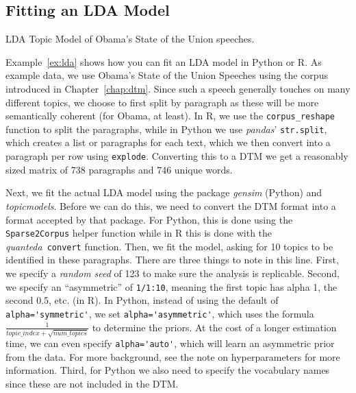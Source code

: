 \subsection{Fitting an LDA Model}\label{sec:ldafit}


\begin{ccsexample}
\caption{LDA Topic Model of Obama's State of the Union speeches.}\label{ex:lda}
\end{ccsexample}

Example~\ref{ex:lda} shows how you can fit an LDA model in Python or R.
As example data, we use Obama's State of the Union Speeches using the corpus introduced in Chapter~\ref{chap:dtm}.
Since such a speech generally touches on many different topics, we choose to first split by paragraph
as these will be more semantically coherent (for Obama, at least).
In R, we use the \texttt{corpus\_reshape} function to split the paragraphs,
while in Python we use \emph{pandas}' \texttt{str.split}, which creates a list or paragraphs for each text,
which we then convert into a paragraph per row using \texttt{explode}.
Converting this to a DTM we get a reasonably sized matrix of 738 paragraphs and 746 unique words.

Next, we fit the actual LDA model using the package \emph{gensim} (Python) and \emph{topicmodels}.
Before we can do this, we need to convert the DTM format into a format accepted by that package.
For Python, this is done using the \texttt{Sparse2Corpus} helper function while in R this is done with the \emph{quanteda}\ \texttt{convert} function.
Then, we fit the model, asking for 10 topics to be identified in these paragraphs.
There are three things to note in this line.
First, we specify a \emph{random seed} of 123 to make sure the analysis is replicable.
Second, we specify an ``asymmetric'' of \verb|1/1:10|, meaning the first topic has alpha 1, the second 0.5, etc. (in R).
In Python, instead  of using the default of \verb|alpha='symmetric'|, we set  \verb|alpha='asymmetric'|, which uses the formula
$\frac{1}{topic\_index + \sqrt{num\_topics}}$ to determine the priors. At the cost of a longer estimation time, we can even
specify \verb|alpha='auto'|, which will learn an asymmetric prior from the data. For more background, see the note on hyperparameters for more information.
Third, for Python we also need to specify the vocabulary names since these are not included in the DTM.

